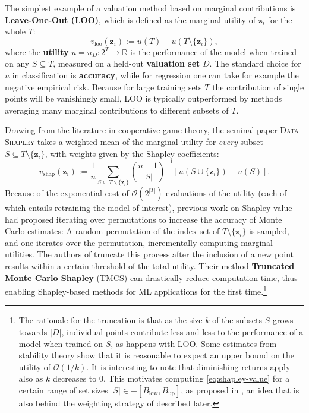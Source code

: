 \documentclass[10pt]{article}
\newcommand{\assign}{:=}
\newcommand{\tmdfn}[1]{\textbf{#1}}
\newcommand{\tmem}[1]{{\em #1\/}}
\newcommand{\tmmathbf}[1]{\ensuremath{\boldsymbol{#1}}}
\newcommand{\tmname}[1]{\textsc{#1}}
\newcommand{\tmop}[1]{\ensuremath{\operatorname{#1}}}
\begin{document}
The simplest example of a valuation method based on marginal contributions is
{\tmdfn{Leave-One-Out (LOO)}}, which is defined as the marginal utility of
$\tmmathbf{z}_i$ for the whole $T$:
\begin{equation}
  v_{\mathrm{loo}} (\tmmathbf{z}_i) \assign u (T) - u (T \setminus
  \{\tmmathbf{z}_i \}), \label{eq:loo}
\end{equation}
where the {\tmdfn{utility}} $u = u_D : 2^T \rightarrow \mathbb{R}$ is the
performance of the model when trained on any $S \subseteq T$, measured on a
held-out {\tmdfn{valuation set}} $D$. The standard choice for $u$ in
classification is {\tmdfn{accuracy}}, while for regression one can take for
example the negative empirical risk. Because for large training sets $T$ the
contribution of single points will be vanishingly small, LOO is typically
outperformed by methods averaging many marginal contributions to different
subsets of $T$.

Drawing from the literature in cooperative game theory, the seminal paper
{\tmname{Data-Shapley}} {\citep{ghorbani_data_2019}} takes a weighted mean
of the marginal utility for {\tmem{every}} subset $S \subseteq T \setminus
\{\tmmathbf{z}_i \}$, with weights given by the Shapley coefficients:
\begin{equation}
  v_{\tmop{shap}} (\tmmathbf{z}_i) \assign \frac{1}{n}  \sum_{S \subseteq
  T\backslash \{\tmmathbf{z}_i \}} \binom{n - 1}{| S |}^{- 1}  [u (S \cup
  \{\tmmathbf{z}_i \}) - u (S)] . \label{eq:shapley-value}
\end{equation}
Because of the exponential cost of $\mathcal{O} (2^{|T|})$ evaluations of the
utility (each of which entails retraining the model of interest), previous
work on Shapley value {\citep{castro_polynomial_2009}} had proposed
iterating over permutations to increase the accuracy of Monte Carlo estimates:
A random permutation of the index set of $T \setminus \{\tmmathbf{z}_i \}$ is
sampled, and one iterates over the permutation, incrementally computing
marginal utilities. The authors of {\cite{ghorbani_data_2019}} truncate this
process after the inclusion of a new point results within a certain threshold
of the total utility. Their method {\tmdfn{Truncated Monte Carlo Shapley}}
(TMCS) can drastically reduce computation time, thus enabling Shapley-based
methods for ML applications for the first time.\footnote{The rationale for the
truncation is that as the size $k$ of the subsets $S$ grows towards $|D|$,
individual points contribute less and less to the performance of a model when
trained on $S$, as happens with LOO. Some estimates from stability theory show
that it is reasonable to expect an upper bound on the utility of $\mathcal{O}
(1 / k)$. It is interesting to note that diminishing returns apply also as $k$
decreases to 0. This motivates computing \eqref{eq:shapley-value} for a
certain range of set sizes $|S| \in + [B_{\tmop{low}}, B_{\tmop{up}}]$, as
proposed in {\cite{watson_accelerated_2023}}, an idea that is also behind the
weighting strategy of {\cite{kwon_beta_2022}} described later.}
\end{document}
